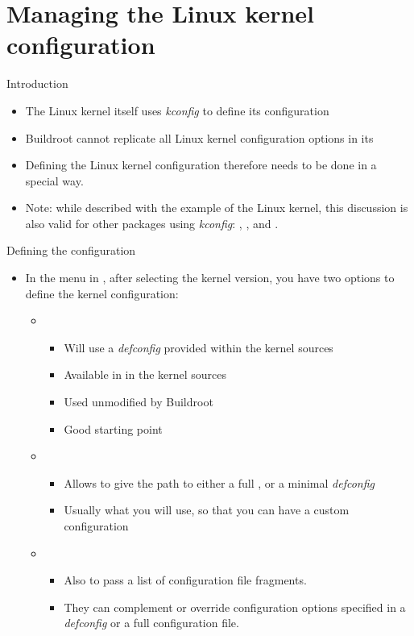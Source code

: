 \section{Managing the Linux kernel configuration}

\begin{frame}{Introduction}
  \begin{itemize}
  \item The Linux kernel itself uses {\em kconfig} to define its
    configuration
  \item Buildroot cannot replicate all Linux kernel configuration
    options in its 
  \item Defining the Linux kernel configuration therefore needs to be
    done in a special way.
  \item Note: while described with the example of the Linux kernel,
    this discussion is also valid for other packages using {\em
      kconfig}: , ,  and
    .
  \end{itemize}
\end{frame}

\begin{frame}{Defining the configuration}
  \begin{itemize}
  \item In the  menu in , after
    selecting the kernel version, you have two options to define the
    kernel configuration:
    \begin{itemize}
    \item {}
      \begin{itemize}
      \item Will use a {\em defconfig} provided within the kernel
        sources
      \item Available in  in the kernel
        sources
      \item Used unmodified by Buildroot
      \item Good starting point
      \end{itemize}
    \item {}
      \begin{itemize}
      \item Allows to give the path to either a full ,
        or a minimal {\em defconfig}
      \item Usually what you will use, so that you can have a custom
        configuration
      \end{itemize}
    \item {}
      \begin{itemize}
      \item Also to pass a list of configuration file fragments.
      \item They can complement or override configuration options
        specified in a {\em defconfig} or a full configuration file.
      \end{itemize}
    \end{itemize}
  \end{itemize}
\end{frame}

